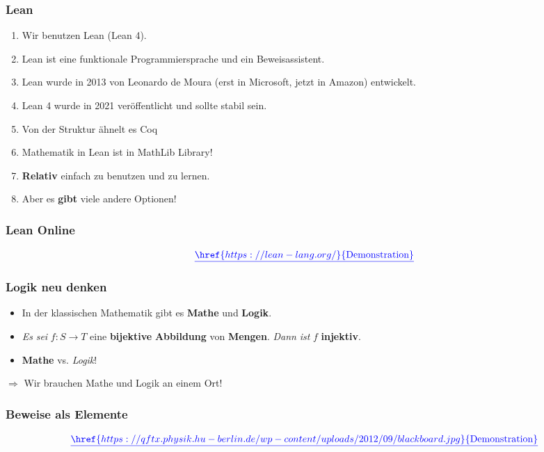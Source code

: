 \documentclass{beamer}
\theoremstyle{definition}
\theoremstyle{remark}
\begin{document}
\begin{frame}
	\frametitle{Lean}
		\begin{enumerate}
			\item Wir benutzen Lean (Lean 4).
			\item Lean ist eine funktionale Programmiersprache und ein Beweisassistent.
			\item Lean wurde in 2013 von Leonardo	de Moura (erst in Microsoft, jetzt in Amazon) entwickelt.
			\item Lean 4 wurde in 2021 veröffentlicht und sollte stabil sein.
			\item Von der Struktur ähnelt es Coq 
			\item Mathematik in Lean ist in MathLib Library! 
			\item \textbf{Relativ} einfach zu benutzen	und zu lernen.
			\item Aber es \textbf{gibt} viele andere Optionen!
		\end{enumerate}
\end{frame}

\begin{frame}
	\frametitle{Lean Online}
	
	\[
		{\color{blue}\underline{\href{https://lean-lang.org/}{\text{Demonstration}}}}
	\]
\end{frame}
\begin{frame}
	\frametitle{Logik neu denken}
	\begin{itemize}
		\item In der klassischen Mathematik gibt es \textbf{Mathe} und \textbf{Logik}.
		\item \emph{Es} \emph{sei}  $f\colon S \to T$ eine \textbf{bijektive} \textbf{Abbildung} von \textbf{Mengen}. \emph{Dann} \emph{ist} $f$ \textbf{injektiv}. 
		\item \textbf{Mathe} vs. \emph{Logik}! \vspace{1cm}
	\end{itemize}
 $\Rightarrow$ Wir brauchen Mathe und Logik an einem Ort!
\end{frame}

\begin{frame}
	\frametitle{Beweise als Elemente}
	\[
		{\color{blue}\underline{\href{https://qftx.physik.hu-berlin.de/wp-content/uploads/2012/09/blackboard.jpg}{\text{Demonstration}}}}
	\]
\end{frame}
\end{document}
